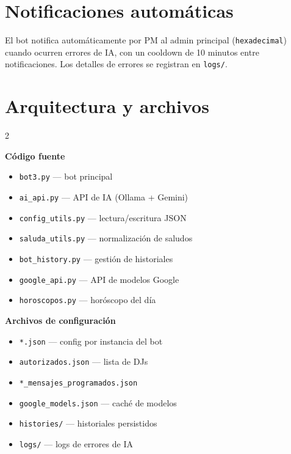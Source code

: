 \documentclass[a4paper,10pt]{article}
\begin{document}
\section{Notificaciones automáticas}

El bot notifica automáticamente por PM al admin principal (\texttt{hexadecimal}) cuando ocurren errores de IA, con un cooldown de 10 minutos entre notificaciones. Los detalles de errores se registran en \texttt{logs/}.

\section{Arquitectura y archivos}

\begin{multicols}{2}
\small

\textbf{Código fuente}
\begin{itemize}[nosep,leftmargin=1em]
  \item \texttt{bot3.py} — bot principal
  \item \texttt{ai\_api.py} — API de IA (Ollama + Gemini)
  \item \texttt{config\_utils.py} — lectura/escritura JSON
  \item \texttt{saluda\_utils.py} — normalización de saludos
  \item \texttt{bot\_history.py} — gestión de historiales
  \item \texttt{google\_api.py} — API de modelos Google
  \item \texttt{horoscopos.py} — horóscopo del día
\end{itemize}

\columnbreak

\textbf{Archivos de configuración}
\begin{itemize}[nosep,leftmargin=1em]
  \item \texttt{*.json} — config por instancia del bot
  \item \texttt{autorizados.json} — lista de DJs
  \item \texttt{*\_mensajes\_programados.json}
  \item \texttt{google\_models.json} — caché de modelos
  \item \texttt{histories/} — historiales persistidos
  \item \texttt{logs/} — logs de errores de IA
\end{itemize}

\end{multicols}
\end{document}
